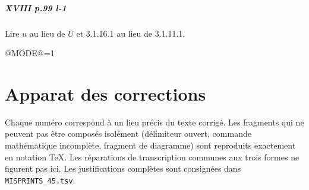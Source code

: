 \documentclass[oneside]{book}
\makeatletter
\theoremstyle{sga-source}
\theoremstyle{sga-source-dash}
\theoremstyle{sga-source-dotdash}
\theoremstyle{sga-source-number-note-dash}
\theoremstyle{sga-source-note-number-dotdash}
\theoremstyle{sga-source-example-dotdash}
\theoremstyle{sga-source-inline-number}
\theoremstyle{sga-source-bare-number}
\theoremstyle{sga-source}
\providecommand\EditionMode{@MODE@}
\makeatother
\begin{document}
\paragraph{XVIII p.99 l-1}
Lire $u$ au lieu de $U$ et 3.1.16.1 au lieu de 3.1.11.1.



\ifnum\EditionMode=1\relax
\clearpage
\chapter*{Apparat des corrections}
Chaque numéro correspond à un lieu précis du texte corrigé. Les fragments qui ne peuvent pas être composés isolément (délimiteur ouvert, commande mathématique incomplète, fragment de diagramme) sont reproduits exactement en notation TeX. Les réparations de transcription communes aux trois formes ne figurent pas ici. Les justifications complètes sont consignées dans \texttt{MISPRINTS\_45.tsv}.
\begingroup\small
\end{document}
